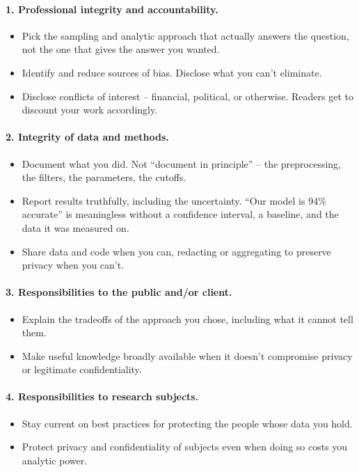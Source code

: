 \documentclass[11pt]{article}
\begin{document}
\paragraph{1. Professional integrity and accountability.}
\begin{itemize}[leftmargin=*,noitemsep]
    \item Pick the sampling and analytic approach that actually
          answers the question, not the one that gives the answer
          you wanted.
    \item Identify and reduce sources of bias. Disclose what you
          can't eliminate.
    \item Disclose conflicts of interest -- financial, political, or
          otherwise. Readers get to discount your work accordingly.
\end{itemize}

\paragraph{2. Integrity of data and methods.}
\begin{itemize}[leftmargin=*,noitemsep]
    \item Document what you did. Not ``document in principle'' -- the
          preprocessing, the filters, the parameters, the cutoffs.
    \item Report results truthfully, including the uncertainty.
          ``Our model is 94\% accurate'' is meaningless without a
          confidence interval, a baseline, and the data it was
          measured on.
    \item Share data and code when you can, redacting or aggregating
          to preserve privacy when you can't.
\end{itemize}

\paragraph{3. Responsibilities to the public and/or client.}
\begin{itemize}[leftmargin=*,noitemsep]
    \item Explain the tradeoffs of the approach you chose, including
          what it cannot tell them.
    \item Make useful knowledge broadly available when it doesn't
          compromise privacy or legitimate confidentiality.
\end{itemize}

\paragraph{4. Responsibilities to research subjects.}
\begin{itemize}[leftmargin=*,noitemsep]
    \item Stay current on best practices for protecting the people
          whose data you hold.
    \item Protect privacy and confidentiality of subjects even when
          doing so costs you analytic power.
\end{itemize}
\end{document}
